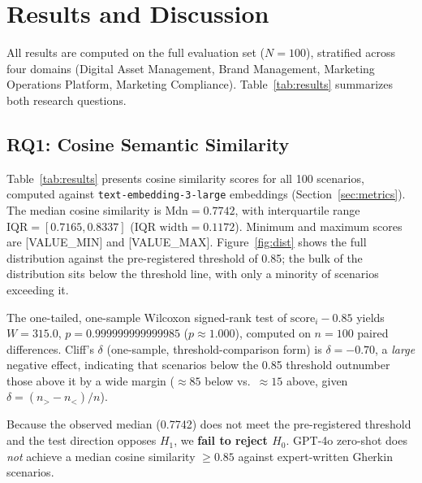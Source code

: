 \section{Results and Discussion}
\label{sec:results-discussion}

All results are computed on the full evaluation set ($N{=}100$), stratified across four domains (Digital Asset Management, Brand Management, Marketing Operations Platform, Marketing Compliance).
Table~\ref{tab:results} summarizes both research questions.

\subsection{RQ1: Cosine Semantic Similarity}
\label{sec:rq1-results}

Table~\ref{tab:results} presents cosine similarity scores for all 100 scenarios, computed against \texttt{text-embedding-3-large} embeddings (Section~\ref{sec:metrics}).
The median cosine similarity is $\text{Mdn} = 0.7742$, with interquartile range $\text{IQR} = [0.7165, 0.8337]$ ($\text{IQR width} = 0.1172$).
%
%
Minimum and maximum scores are [VALUE\_MIN] and [VALUE\_MAX].
Figure~\ref{fig:dist} shows the full distribution against the pre-registered threshold of 0.85; the bulk of the distribution sits below the threshold line, with only a minority of scenarios exceeding it.

The one-tailed, one-sample Wilcoxon signed-rank test of $\text{score}_i - 0.85$ yields $W = 315.0$, $p = 0.999999999999985$ ($p \approx 1.000$), computed on $n=100$ paired differences.
Cliff's $\delta$ (one-sample, threshold-comparison form) is $\delta = -0.70$, a \emph{large} negative effect, indicating that scenarios below the 0.85 threshold outnumber those above it by a wide margin ($\approx 85$ below vs.\ $\approx 15$ above, given $\delta = (n_{>} - n_{<})/n$).

Because the observed median (0.7742) does not meet the pre-registered threshold and the test direction opposes $H_1$, we \textbf{fail to reject $H_0$}.
GPT-4o zero-shot does \emph{not} achieve a median cosine similarity $\geq 0.85$ against expert-written Gherkin scenarios.

